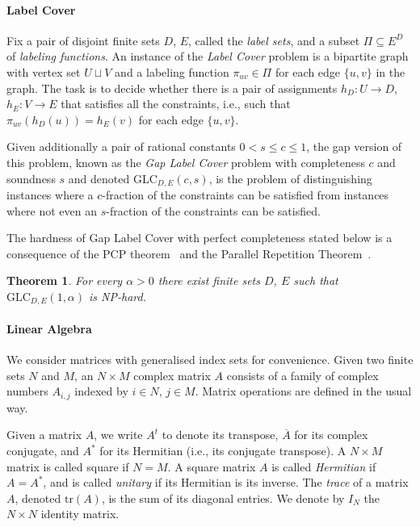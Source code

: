 \documentclass[a4paper,11pt]{article}
\newtheorem{theorem}{Theorem}[section]
\theoremstyle{definition}
\newcommand{\glc}{\mathrm{GLC}}
\newcommand{\tsp}[1]{{#1}^{t}}
\newcommand{\tr}{\mathrm{tr}}
\begin{document}
\paragraph{Label Cover} Fix a pair of disjoint finite sets $D$, $E$, called the \emph{label sets}, and a subset $\Pi \subseteq E^D$ of \emph{labeling functions}. An instance of the \emph{Label Cover} problem is a bipartite graph with vertex set $U \sqcup V$ and a labeling function $\pi_{uv} \in \Pi$ for each edge $\{u,v\}$ in the graph.  The task is to decide whether there is a pair of assignments $h_D:U\to D$, $h_E:V\to E$ that satisfies all the constraints, i.e., such that $\pi_{uv}(h_D(u))=h_E(v)$ for each edge $\{u,v\}$.

Given additionally a pair of rational constants $0 < s \leq c \leq 1$, the gap version of this problem, known as the \emph{Gap Label Cover} problem with completeness $c$ and soundness $s$ and denoted $\glc_{D,E}(c,s)$, is the problem of distinguishing instances where a $c$-fraction of the constraints can be satisfied from instances where not even an $s$-fraction of the constraints can be satisfied. 

The hardness of Gap Label Cover with perfect completeness stated below is a consequence of the PCP theorem~\cite{Arora98:jacm-proof,Arora98:jacm-probabilistic} and the Parallel Repetition Theorem~\cite{Raz98}.

\begin{theorem}
\label{th:gap-label-cover}
    For every $\alpha >0$ there exist finite sets $D$, $E$ such that $\glc_{D,E}(1,\alpha)$ is NP-hard.
\end{theorem}

\paragraph{Linear Algebra}
We consider matrices with generalised index sets for convenience. 
Given two finite sets $N$ and $M$, an $N\times M$ complex matrix $A$ consists of a family of complex numbers $A_{i,j}$ indexed by $i\in N$, $j\in M$. Matrix operations are defined in the usual way. 
\par
Given a matrix $A$, we write $\tsp{A}$
to denote its transpose, $\overline{A}$ for its complex conjugate, and $A^*$ for its Hermitian (i.e., its conjugate transpose).
A $N\times M$ matrix is called square if $N=M$. A square matrix $A$ is called \textit{Hermitian} if $A=A^*$, and is called \textit{unitary} if its Hermitian is its inverse. The \textit{trace} of a matrix $A$, denoted $\tr(A)$, is the sum of its diagonal entries.  We denote by $I_N$ the $N\times N$ identity matrix. 
\par
\end{document}
